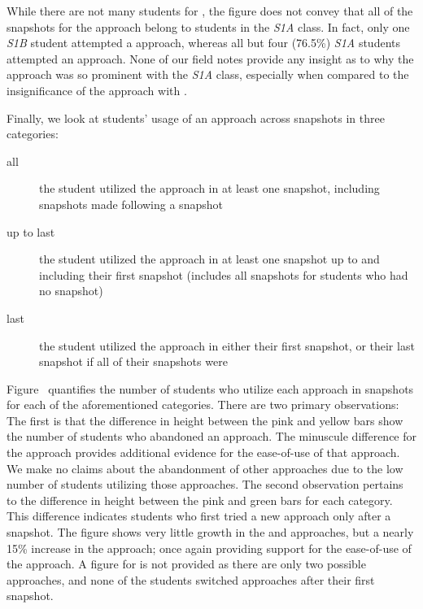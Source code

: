 While there are not many students for \sone{}, the figure does not convey that
all of the \com{} snapshots for the \rel{} approach belong to students in the
\emph{S1A} class. In fact, only one \emph{S1B} student attempted a \rel{}
approach, whereas all but four (76.5\%) \emph{S1A} students attempted an \abs{}
approach. None of our field notes provide any insight as to why the \rel{}
approach was so prominent with the \emph{S1A} class, especially when compared
to the insignificance of the \rel{} approach with \stwo{}.

Finally, we look at students' usage of an approach across snapshots in three
categories:

\begin{description}
\item[all] the student utilized the approach in at least one snapshot,
  including snapshots made following a \com{} snapshot
\item[up to last] the student utilized the approach in at least one snapshot up
  to and including their first \com{} snapshot (includes all snapshots for
  students who had no \com{} snapshot)
\item[last] the student utilized the approach in either their first \com{}
  snapshot, or their last snapshot if all of their snapshots were \incom{}
\end{description}

Figure~ quantifies the number of students who
utilize each approach in \stwo{} snapshots for each of the aforementioned
categories. There are two primary observations: The first is that the
difference in height between the pink and yellow bars show the number of
students who abandoned an approach. The minuscule difference for the \glideto{}
approach provides additional evidence for the ease-of-use of that approach. We
make no claims about the abandonment of other approaches due to the low number
of students utilizing those approaches. The second observation pertains to the
difference in height between the pink and green bars for each category. This
difference indicates students who first tried a new approach only after a
\com{} snapshot. The figure shows very little growth in the \abs{} and \rel{}
approaches, but a nearly 15\% increase in the \glideto{} approach; once again
providing support for the ease-of-use of the \glideto{} approach. A figure for
\sone{} is not provided as there are only two possible approaches, and none of
the students switched approaches after their first \com{} snapshot.

